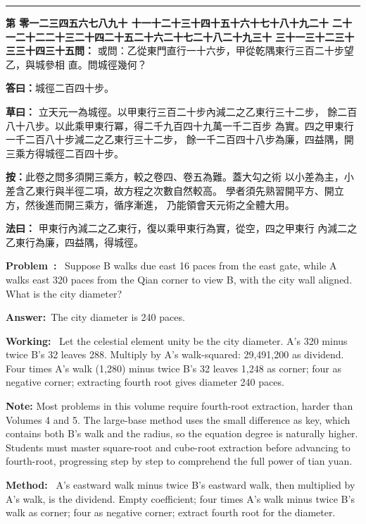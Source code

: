 \documentclass[9pt,a4paper]{article}
\newcounter{probnum}
\newcounter{overallnum}
\newcommand{\chnum}[1]{%
  \ifcase#1 零\or 一\or 二\or 三\or 四\or 五\or 六\or 七\or 八\or 九\or 十\or
    十一\or 十二\or 十三\or 十四\or 十五\or 十六\or 十七\or 十八\or 十九\or 二十\or
    二十一\or 二十二\or 二十三\or 二十四\or 二十五\or 二十六\or 二十七\or 二十八\or 二十九\or 三十\or
    三十一\or 三十二\or 三十三\or 三十四\or 三十五\fi}
\newcommand{\problem}[1]{\stepcounter{probnum}\stepcounter{overallnum}\par\noindent\textbf{\color{volcolor}第\chnum{\value{probnum}}問：}#1\par\vspace{0.15cm}}
\newcommand{\answer}[1]{\par\noindent\textbf{答曰：}#1\par\vspace{0.15cm}}
\newcommand{\working}[1]{\par\noindent\textbf{草曰：}#1\par\vspace{0.15cm}}
\newcommand{\method}[1]{\par\noindent\textbf{法曰：}#1\par\vspace{0.25cm}}
\newcommand{\eproblem}[1]{\par\noindent\textbf{\color{volcolor}Problem~\theoverallnum:}~#1\par\vspace{0.15cm}}
\newcommand{\eanswer}[1]{\par\noindent\textbf{Answer:}~#1\par\vspace{0.15cm}}
\newcommand{\eworking}[1]{\par\noindent\textbf{Working:}~#1\par\vspace{0.15cm}}
\newcommand{\emethod}[1]{\par\noindent\textbf{Method:}~#1\par\vspace{0.25cm}}
\begin{document}
\vspace{0.15cm}
\noindent\rule{\textwidth}{0.2pt}
\vspace{0.15cm}

\noindent\begin{minipage}[t]{0.48\textwidth}
\problem{
或問：乙從東門直行一十六步，甲從乾隅東行三百二十步望乙，與城參相
直。問城徑幾何？
}

\answer{城徑二百四十步。}

\working{
立天元一為城徑。以甲東行三百二十步內減二之乙東行三十二步，
餘二百八十八步。以此乘甲東行冪，得二千九百四十九萬一千二百步
為實。四之甲東行一千二百八十步減二之乙東行三十二步，
餘一千二百四十八步為廉，四益隅，開三乘方得城徑二百四十步。

\textbf{按：}此卷之問多須開三乘方，較之卷四、卷五為難。蓋大勾之術
以小差為主，小差含乙東行與半徑二項，故方程之次數自然較高。
學者須先熟習開平方、開立方，然後進而開三乘方，循序漸進，
乃能領會天元術之全體大用。
}

\method{
甲東行內減二之乙東行，復以乘甲東行為實，從空，四之甲東行
內減二之乙東行為廉，四益隅，得城徑。
}
\end{minipage}%
\hfill%
\begin{minipage}[t]{0.50\textwidth}
\eproblem{
Suppose B walks due east 16 paces from the east gate, while A walks east 320
paces from the Qian corner to view B, with the city wall aligned. What is
the city diameter?
}

\eanswer{The city diameter is 240 paces.}

\eworking{
Let the celestial element unity be the city diameter. A's 320 minus twice
B's 32 leaves 288. Multiply by A's walk-squared: 29,491,200 as dividend.
Four times A's walk (1,280) minus twice B's 32 leaves 1,248 as corner;
four as negative corner; extracting fourth root gives diameter 240 paces.

\textbf{Note:} Most problems in this volume require fourth-root extraction,
harder than Volumes 4 and 5. The large-base method uses the small difference
as key, which contains both B's walk and the radius, so the equation degree
is naturally higher. Students must master square-root and cube-root extraction
before advancing to fourth-root, progressing step by step to comprehend the
full power of tian yuan.
}

\emethod{
A's eastward walk minus twice B's eastward walk, then multiplied by A's walk,
is the dividend. Empty coefficient; four times A's walk minus twice B's walk
as corner; four as negative corner; extract fourth root for the diameter.
}
\end{minipage}
\vspace{0.15cm}
\end{document}
